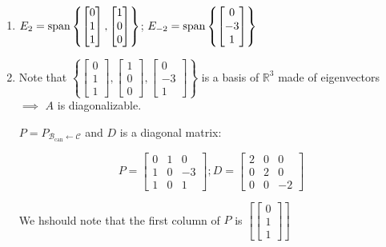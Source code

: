 \begin{sol}
	\begin{enumerate}
		\item $E_2 = \mathrm{span}\left\{
				\begin{bmatrix}
					0\\1\\1
				\end{bmatrix}, \begin{bmatrix}
					1\\0\\0
				\end{bmatrix}
			\right\}$; $E_{-2} = \mathrm{span}\left\{
				\begin{bmatrix}
					0\\-3\\1
				\end{bmatrix}
			\right\}$

			\item Note that $\left\{
				\begin{bmatrix}
					0\\1\\1
				\end{bmatrix}, \begin{bmatrix}
					1\\0\\0
				\end{bmatrix}, \begin{bmatrix}
					0\\-3\\1
				\end{bmatrix}
				\right\}$ is a basis of $\mathbb{R}^3$ made of eigenvectors $\implies$ $A$ is diagonalizable.

				$P = P_{\mathcal{B}_{\mathrm{can}} \leftarrow \mathcal{C}}$ and $D$ is a diagonal matrix:

				\[P = \begin{bmatrix}
					0&1&0\\1&0&-3\\1&0&1
				\end{bmatrix}; D = \begin{bmatrix}
					2&0&0\\0&2&0\\0&0&-2
				\end{bmatrix}\]

				We hshould note that the first column of $P$ is $\left[\begin{bmatrix}
					0\\1\\1
				\end{bmatrix}\right]$


\end{enumerate}
\end{sol}
